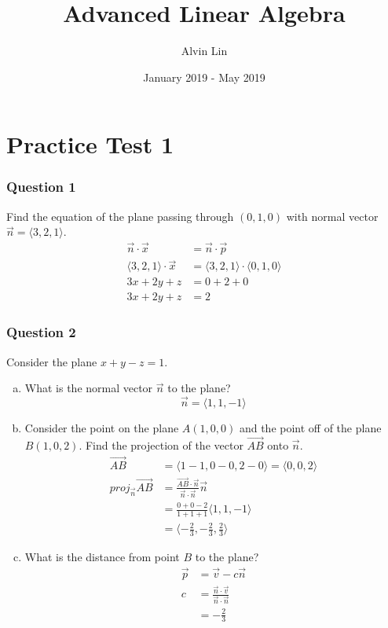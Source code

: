 \documentclass{math}
\title{Advanced Linear Algebra}
\author{Alvin Lin}
\date{January 2019 - May 2019}
\begin{document}
\maketitle

\section*{Practice Test 1}

\subsubsection*{Question 1}
Find the equation of the plane passing through \( (0, 1, 0) \) with normal
vector \( \vec{n} = \langle3,2,1\rangle \).
\begin{align*}
  \vec{n}\cdot\vec{x} &= \vec{n}\cdot\vec{p} \\
  \langle3,2,1\rangle\cdot\vec{x} &=
    \langle3,2,1\rangle\cdot\langle0,1,0\rangle \\
  3x+2y+z &= 0+2+0 \\
  3x+2y+z &= 2
\end{align*}

\subsubsection*{Question 2}
Consider the plane \( x+y-z = 1 \).
\begin{enumerate}[(a)]
  \item What is the normal vector \( \vec{n} \) to the plane?
  \[ \vec{n} = \langle1,1,-1\rangle \]
  \item Consider the point on the plane \( A(1,0,0) \) and the point off of the
    plane \( B(1,0,2) \). Find the projection of the vector
    \( \overrightarrow{AB} \) onto \( \vec{n} \).
  \begin{align*}
    \overrightarrow{AB} &= \langle1-1,0-0,2-0\rangle = \langle0,0,2\rangle \\
    proj_{\vec{n}}\overrightarrow{AB} &= \frac{\overrightarrow{AB}\cdot\vec{n}}
      {\vec{n}\cdot\vec{n}}\vec{n} \\
    &= \frac{0+0-2}{1+1+1}\langle1,1,-1\rangle \\
    &= \langle-\frac{2}{3},-\frac{2}{3},\frac{2}{3}\rangle
  \end{align*}
  \item What is the distance from point \( B \) to the plane?
  \begin{align*}
    \vec{p} &= \vec{v}-c\vec{n} \\
    c &= \frac{\vec{n}\cdot\vec{v}}{\vec{n}\cdot\vec{n}} \\
    &= -\frac{2}{3}
  \end{align*}
\end{enumerate}
\end{document}
